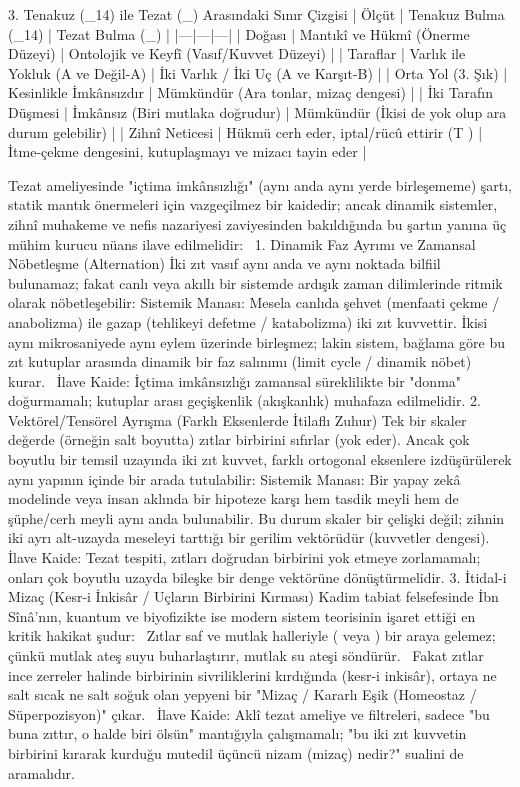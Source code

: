 \documentclass[11pt,a4paper]{article}
\begin{document}
3. Tenakuz (_{14}) ile Tezat (_{}) Arasındaki Sınır Çizgisi
| Ölçüt | Tenakuz Bulma (_{14}) | Tezat Bulma (_{}) |
|---|---|---|
| Doğası | Mantıkî ve Hükmî (Önerme Düzeyi) | Ontolojik ve Keyfî (Vasıf/Kuvvet Düzeyi) |
| Taraflar | Varlık ile Yokluk (A ve Değil-A) | İki Varlık / İki Uç (A ve Karşıt-B) |
| Orta Yol (3. Şık) | Kesinlikle İmkânsızdır | Mümkündür (Ara tonlar, mizaç dengesi) |
| İki Tarafın Düşmesi | İmkânsız (Biri mutlaka doğrudur) | Mümkündür (İkisi de yok olup ara durum gelebilir) |
| Zihnî Neticesi | Hükmü cerh eder, iptal/rücû ettirir (T ) | İtme-çekme dengesini, kutuplaşmayı ve mizacı tayin eder |



Tezat ameliyesinde "içtima imkânsızlığı" (aynı anda aynı yerde birleşememe) şartı, statik mantık önermeleri için vazgeçilmez bir kaidedir; ancak dinamik sistemler, zihnî muhakeme ve nefis nazariyesi zaviyesinden bakıldığında bu şartın yanına üç mühim kurucu nüans ilave edilmelidir:  
1. Dinamik Faz Ayrımı ve Zamansal Nöbetleşme (Alternation)
İki zıt vasıf aynı anda ve aynı noktada bilfiil bulunamaz; fakat canlı veya akıllı bir sistemde ardışık zaman dilimlerinde ritmik olarak nöbetleşebilir:
 Sistemik Manası: Mesela canlıda şehvet (menfaati çekme / anabolizma) ile gazap (tehlikeyi defetme / katabolizma) iki zıt kuvvettir. İkisi aynı mikrosaniyede aynı eylem üzerinde birleşmez; lakin sistem, bağlama göre bu zıt kutuplar arasında dinamik bir faz salınımı (limit cycle / dinamik nöbet) kurar.  
 İlave Kaide: İçtima imkânsızlığı zamansal süreklilikte bir "donma" doğurmamalı; kutuplar arası geçişkenlik (akışkanlık) muhafaza edilmelidir.
2. Vektörel/Tensörel Ayrışma (Farklı Eksenlerde İtilaflı Zuhur)
Tek bir skaler değerde (örneğin salt  boyutta) zıtlar birbirini sıfırlar (yok eder). Ancak çok boyutlu bir temsil uzayında iki zıt kuvvet, farklı ortogonal eksenlere izdüşürülerek aynı yapının içinde bir arada tutulabilir:
 Sistemik Manası: Bir yapay zekâ modelinde veya insan aklında bir hipoteze karşı hem tasdik meyli hem de şüphe/cerh meyli aynı anda bulunabilir. Bu durum skaler bir çelişki değil; zihnin iki ayrı alt-uzayda meseleyi tarttığı bir gerilim vektörüdür (kuvvetler dengesi).  
 İlave Kaide: Tezat tespiti, zıtları doğrudan birbirini yok etmeye zorlamamalı; onları çok boyutlu uzayda bileşke bir denge vektörüne dönüştürmelidir.
3. İtidal-i Mizaç (Kesr-i İnkisâr / Uçların Birbirini Kırması)
Kadim tabiat felsefesinde İbn Sînâ'nın, kuantum ve biyofizikte ise modern sistem teorisinin işaret ettiği en kritik hakikat şudur:  
 Zıtlar saf ve mutlak halleriyle ( veya ) bir araya gelemez; çünkü mutlak ateş suyu buharlaştırır, mutlak su ateşi söndürür.  
 Fakat zıtlar ince zerreler halinde birbirinin sivriliklerini kırdığında (kesr-i inkisâr), ortaya ne salt sıcak ne salt soğuk olan yepyeni bir "Mizaç / Kararlı Eşik (Homeostaz / Süperpozisyon)" çıkar.  
 İlave Kaide: Aklî tezat ameliye ve filtreleri, sadece "bu buna zıttır, o halde biri ölsün" mantığıyla çalışmamalı; "bu iki zıt kuvvetin birbirini kırarak kurduğu mutedil üçüncü nizam (mizaç) nedir?" sualini de aramalıdır. 
\end{document}
